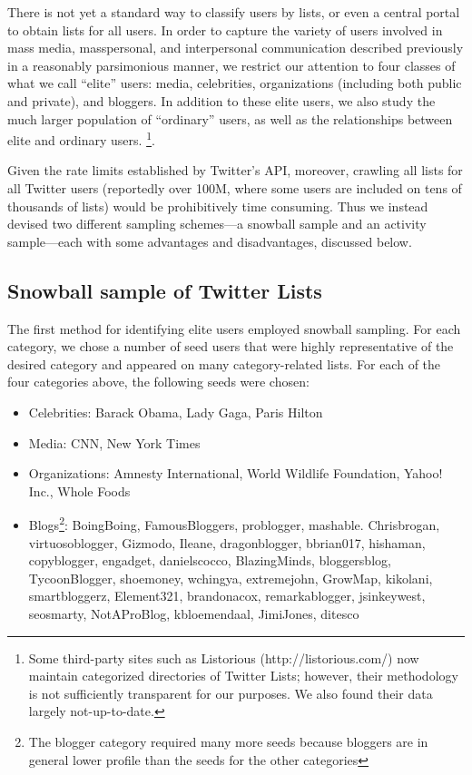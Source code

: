 \documentclass[phd,tocprelim]{cornell}
\begin{document}
There is not yet a standard way to classify users by lists, or even a
central portal to obtain lists for all users. In order to capture the
variety of users involved in mass media, masspersonal, and interpersonal
communication described previously in a reasonably
parsimonious manner, we restrict our attention to four classes of what we
call ``elite'' users: media, celebrities, organizations (including both
public and private), and bloggers. In addition to these elite users, we
also study the much larger population of ``ordinary'' users, as well as the
relationships between elite and ordinary users.
 \footnote{Some
 third-party sites such as Listorious (http://listorious.com/) now
 maintain categorized directories of Twitter Lists; however, their
 methodology is not sufficiently transparent for our
 purposes. We also found their data largely not-up-to-date.}. 


Given the rate limits established by Twitter's API, moreover, crawling all
lists for all Twitter users (reportedly over 100M, where some users are
included on tens of thousands of lists) would be prohibitively time
consuming. Thus we instead devised two different sampling schemes---a
snowball sample and an activity sample---each with some advantages and
disadvantages, discussed below.


\subsection{Snowball sample of Twitter Lists}
The first method for identifying elite users employed snowball sampling.
For each category, we chose a number of seed users that were highly
representative of the desired category and appeared on many
category-related lists. For each of the four categories above, the
following seeds were chosen:
\begin{itemize}
	\item Celebrities: Barack Obama, Lady Gaga, Paris Hilton
	\item Media: CNN, New York Times
	\item Organizations: Amnesty International, World Wildlife
          Foundation, Yahoo! Inc., Whole Foods
	\item Blogs\footnote{The blogger category required many more seeds
          because bloggers are in general lower profile than the seeds for
          the other categories}: BoingBoing, FamousBloggers, problogger,
          mashable. Chrisbrogan, virtuosoblogger, Gizmodo, Ileane,
          dragonblogger, bbrian017, hishaman, copyblogger, engadget,
          danielscocco, BlazingMinds, bloggersblog, TycoonBlogger,
          shoemoney, wchingya, extremejohn, GrowMap, kikolani,
          smartbloggerz, Element321, brandonacox, remarkablogger,
          jsinkeywest, seosmarty, NotAProBlog, kbloemendaal, JimiJones,
          ditesco
\end{itemize}
\end{document}
